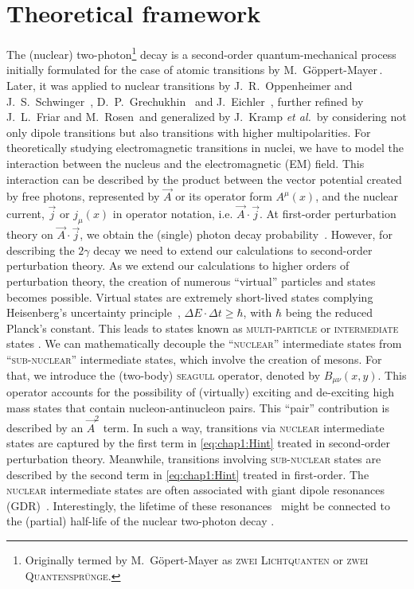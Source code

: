 \section{Theoretical framework}\label{sec:chap1:theory}
The (nuclear) two-photon\footnote{Originally termed by M.~Göpert-Mayer as \textsc{zwei Lichtquanten} or \textsc{zwei Quantensprünge}.} decay is a second-order quantum-mechanical process initially formulated for the case of atomic transitions by M.~G\"{o}ppert-Mayer\,\cite{Goeppert-1929, Goeppert-Mayer-1931}. Later, it was applied to nuclear transitions by J.~R.~Oppenheimer and J.~S.~Schwinger~\cite{PhysRev.56.1066}, D.~P.~Grechukhin~\cite{GRECHUKHIN1963273ussr,GRECHUKHIN1962,Grechukhin-1963, GRECHUKHIN1965} and J.~Eichler~\cite{Eichler1959,Eichler-1974}, further refined by J.~L.~Friar and M.~Rosen\,\cite{Friar-1974, Friar-1975} and generalized by J.~Kramp {\it et al.}\,\cite{Kramp-1987} by considering not only dipole transitions but also transitions with higher multipolarities.
\newpar
For theoretically studying electromagnetic transitions in nuclei, we have to model the interaction between the nucleus and the electromagnetic (\textsc{EM}) field.
This interaction can be described by the product between the vector potential created by free photons, represented by $\vec{A}$ or its operator form $A^\mu(x)$, and the nuclear current, $\vec{j}$ or $j_\mu(x)$ in operator notation, i.e. $\vec{A}\cdot \vec{j}$.
At first-order perturbation theory on $\vec{A}\cdot \vec{j}$, we obtain the (single) photon decay probability~\cite{osti_4785718}. 
However, for describing the $2\gamma$ decay we need to extend our calculations to second-order perturbation theory. As we extend our calculations to higher orders of perturbation theory, the creation of numerous ``virtual'' particles and states becomes possible.
\newpar
Virtual states are extremely short-lived states complying Heisenberg's uncertainty principle~\cite{Heisenberg1927}, $\Delta E \cdot \Delta t \geq \hbar$, with $\hbar$ being the reduced Planck's constant. This leads to states known as \textsc{multi-particle} or \textsc{intermediate} states \cite{Peskin:1995ev}. We can mathematically decouple the ``\textsc{nuclear}'' intermediate states from ``\textsc{sub-nuclear}'' intermediate states, which involve the creation of mesons. For that, we introduce the (two-body) \textsc{seagull} operator, denoted by $B_{\mu\nu}(x, y)$. This operator accounts for the possibility of (virtually) exciting and de-exciting high mass states that contain nucleon-antinucleon pairs. This ``pair'' contribution is described by an $\vec{A}^2$ term. 
In such a way, transitions via \textsc{nuclear} intermediate states are captured by the first term in \cref{eq:chap1:Hint} treated in second-order perturbation theory. Meanwhile, transitions involving \textsc{sub-nuclear} states are described by the second term in \cref{eq:chap1:Hint} treated in first-order.
The \textsc{nuclear} intermediate states are often associated with giant dipole resonances (\textsc{GDR})~\cite{Friar-1975}. Interestingly, the lifetime of these resonances~\cite{JSpeth_1981,resonances} might be connected to the (partial) half-life of the nuclear two-photon decay \cite{MARGOLIS1961524}.

